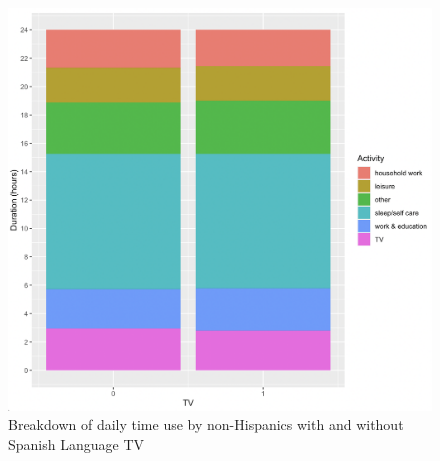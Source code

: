 \documentclass[11pt]{article}
\begin{document}
\begin{figure}[!hbtp]
\centering
\caption{Breakdown of daily time use by non-Hispanics with and without Spanish Language TV}\label{f:atus_breakdown_nonhispanic}
\includegraphics[width=14.4cm]{../../analysis/Output/graphs/time_breakdown_nonhispanic.png}
\end{figure} 
\end{document}
